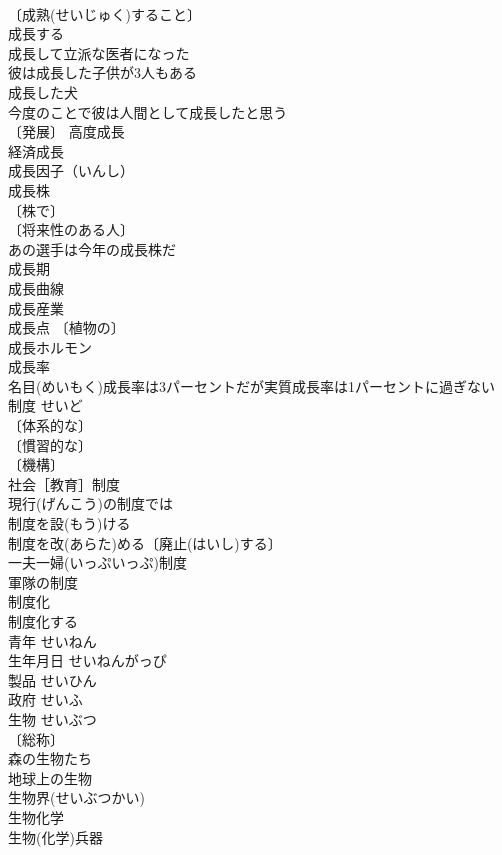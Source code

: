 \documentclass[8pt]{extreport}
\begin{document}
\begin{CJK}{UTF8}{min}
\\	〔成熟(せいじゅく)すること〕
\\	成長する 
\\	成長して立派な医者になった 
\\	彼は成長した子供が3人もある 
\\	成長した犬 
\\	今度のことで彼は人間として成長したと思う 
\\	〔発展〕 高度成長 
\\	経済成長 
\\	成長因子（いんし） 
\\	成長株 
\\	〔株で〕
\\	〔将来性のある人〕
\\	あの選手は今年の成長株だ 
\\	成長期 
\\	成長曲線 
\\	成長産業 
\\	成長点 〔植物の〕
\\	成長ホルモン 
\\	成長率 
\\	名目(めいもく)成長率は3パーセントだが実質成長率は1パーセントに過ぎない 
\\	制度	せいど	
\\	〔体系的な〕
\\	〔慣習的な〕
\\	〔機構〕
\\	社会［教育］制度 
\\	現行(げんこう)の制度では 
\\	制度を設(もう)ける 
\\	制度を改(あらた)める〔廃止(はいし)する〕 
\\	一夫一婦(いっぷいっぷ)制度 
\\	軍隊の制度 
\\	制度化 
\\	制度化する 
\\	青年	せいねん	
\\	生年月日	せいねんがっぴ	
\\	製品	せいひん	
\\	政府	せいふ	
\\	生物	せいぶつ	
\\	〔総称〕
\\	森の生物たち 
\\	地球上の生物 
\\	生物界(せいぶつかい) 
\\	生物化学 
\\	生物(化学)兵器 

\end{CJK}
\end{document}
